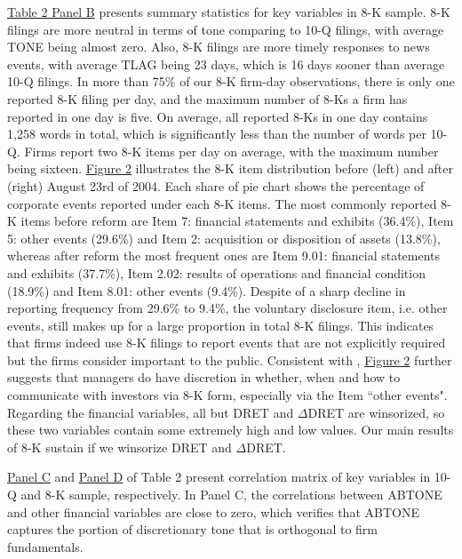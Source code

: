 \documentclass[a4paper]{article}
\begin{document}
\begin{spacing}{2}
\hyperref[T2PB]{Table 2 Panel B} presents summary statistics for key variables in 8-K sample. 8-K filings are more neutral in terms of tone comparing to 10-Q filings, with average TONE being almost zero. Also, 8-K filings are more timely responses to news events, with average TLAG being 23 days, which is 16 days sooner than average 10-Q filings. In more than 75\% of our 8-K firm-day observations, there is only one reported 8-K filing per day, and the maximum number of 8-Ks a firm has reported in one day is five. On average, all reported 8-Ks in one day contains 1,258 words in total, which is significantly less than the number of words per 10-Q. Firms report two 8-K items per day on average, with the maximum number being sixteen. \hyperref[fig2]{Figure 2} illustrates the 8-K item distribution before (left) and after (right) August 23rd of 2004. Each share of pie chart shows the percentage of corporate events reported under each 8-K items. The most commonly reported 8-K items before reform are Item 7: financial statements and exhibits (36.4\%), Item 5: other events (29.6\%) and Item 2: acquisition or disposition of assets (13.8\%), whereas after reform the most frequent ones are Item 9.01: financial statements and exhibits (37.7\%), Item 2.02: results of operations and financial condition (18.9\%) and Item 8.01: other events (9.4\%). Despite of a sharp decline in reporting frequency from 29.6\% to 9.4\%, the voluntary disclosure item, i.e. other events, still makes up for a large proportion in total 8-K filings. This indicates that firms indeed use 8-K filings to report events that are not explicitly required but the firms consider important to the public. Consistent with \citet{baoManagersDiscloseWithhold2019}, \hyperref[fig2]{Figure 2} further suggests that managers do have discretion in whether, when and how to communicate with investors via 8-K form, especially via the Item ``other events". Regarding the financial variables, all but DRET and $\Delta$DRET are winsorized, so these two variables contain some extremely high and low values. Our main results of 8-K sustain if we winsorize DRET and $\Delta$DRET.

\hyperref[T2PC]{Panel C} and \hyperref[T2PD]{Panel D} of Table 2 present correlation matrix of key variables in 10-Q and 8-K sample, respectively. In Panel C, the correlations between ABTONE and other financial variables are close to zero, which verifies that ABTONE captures the portion of discretionary tone that is orthogonal to firm fundamentals. 


\end{spacing}
\end{document}
